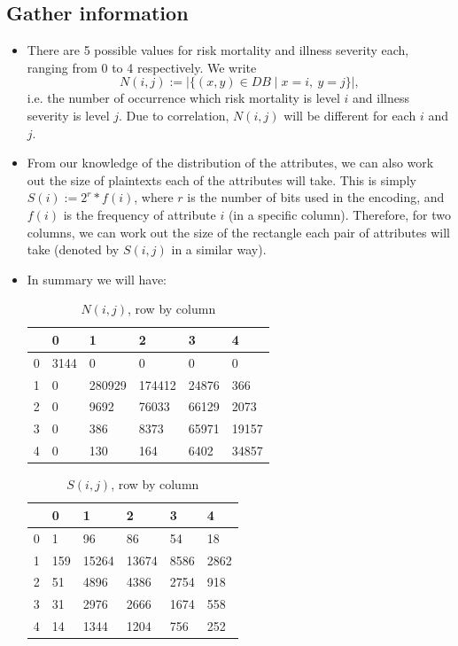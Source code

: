 \documentclass{article}
\begin{document}
\subsection{Gather information}
\begin{itemize}
	\item There are 5 possible values for risk mortality and illness severity each, ranging from 0 to 4 respectively. We write 
	\begin{equation*}
		N(i,j) := | \{(x,y) \in DB\mid x = i, \ y = j\} |,
	\end{equation*}
	i.e. the number of occurrence which risk mortality is level $i$ and illness severity is level $j$. Due to correlation, $N(i, j)$ will be different for each $i$ and $j$.
	
	\item From our knowledge of the distribution of the attributes, we can also work out the size of plaintexts each of the attributes will take. This is simply $S(i) := 2^r * f(i)$, where $r$ is the number of bits used in the encoding, and $f(i)$ is the frequency of attribute $i$ (in a specific column). Therefore, for two columns, we can work out the size of the rectangle each pair of attributes will take (denoted by $S(i,j)$ in a similar way).
	
	\item In summary we will have:
	\begin{table}[H] \label{t1}
		\centering
		\begin{tabular}{|l|l|l|l|l|l|}
			\hline
			& 0    & 1      & 2      & 3     & 4     \\ \hline
			0 & 3144 & 0      & 0      & 0     & 0     \\ \hline
			1 & 0    & 280929 & 174412 & 24876 & 366   \\ \hline
			2 & 0    & 9692   & 76033  & 66129 & 2073  \\ \hline
			3 & 0    & 386    & 8373   & 65971 & 19157 \\ \hline
			4 & 0    & 130    & 164    & 6402  & 34857 \\ \hline
		\end{tabular}
		\caption{$N(i,j)$, row by column}
	\end{table}

	\begin{table}[H]
		\centering
		\begin{tabular}{|l|l|l|l|l|l|}
			\hline
			& 0   & 1     & 2     & 3    & 4    \\ \hline
			0 & 1   & 96    & 86    & 54   & 18   \\ \hline
			1 & 159 & 15264 & 13674 & 8586 & 2862 \\ \hline
			2 & 51  & 4896  & 4386  & 2754 & 918  \\ \hline
			3 & 31  & 2976  & 2666  & 1674 & 558  \\ \hline
			4 & 14  & 1344  & 1204  & 756  & 252  \\ \hline
		\end{tabular}
		\caption{$S(i,j)$, row by column}
	\end{table}
\end{itemize}
\end{document}
